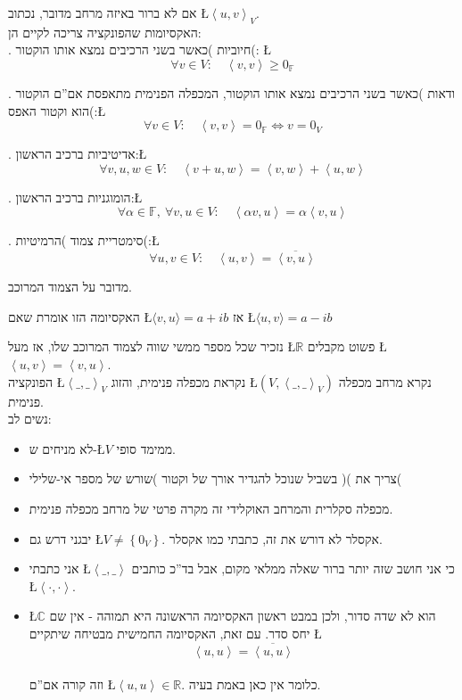 \documentclass[english,hebrew]{article}
\begin{document}
אם לא ברור באיזה מרחב מדובר, נכתוב \L{$\left\langle u,v\right\rangle _{V}$}.\\

האקסיומות שהפונקציה צריכה לקיים הן:\\

{\endL}. חיוביות )כאשר בשני הרכיבים נמצא אותו הוקטור(: \L{%
\[
\forall v\in V:\quad\left\langle v,v\right\rangle \geq0_{\mathbb{F}}
\]
}%

{\endL}. ודאות )כאשר בשני הרכיבים נמצא אותו הוקטור, המכפלה
הפנימית מתאפסת אם\textquotedblright ם הוקטור הוא וקטור האפס(:\L{%
\[
\forall v\in V:\quad\left\langle v,v\right\rangle =0_{\mathbb{F}}\iff v=0_{V}
\]
}%

{\endL}. אדיטיביות ברכיב הראשון:\L{%
\[
\forall v,u,w\in V:\quad\left\langle v+u,w\right\rangle =\left\langle v,w\right\rangle +\left\langle u,w\right\rangle 
\]
}%

{\endL}. הומוגניות ברכיב הראשון:\L{%
\[
\forall\alpha\in\mathbb{F},\ \forall v,u\in V:\quad\left\langle \alpha v,u\right\rangle =\alpha\left\langle v,u\right\rangle 
\]
}%

{\endL}. סימטריית צמוד )הרמיטיות(:\L{%
\[
\forall u,v\in V:\quad\left\langle u,v\right\rangle =\overline{\left\langle v,u\right\rangle }
\]
}%

מדובר על הצמוד המרוכב.

האקסיומה הזו אומרת שאם \L{$\langle v,u\rangle=a+ib$} אז \L{$\langle u,v\rangle=a-ib$}

נזכיר שכל מספר ממשי שווה לצמוד המרוכב שלו, אז מעל \L{$\mathbb{R}$}
פשוט מקבלים \L{$\left\langle u,v\right\rangle =\left\langle v,u\right\rangle $}.\\

הפונקציה \L{$\left\langle \_,\_\right\rangle _{V}$} נקראת מכפלה פנימית,
והזוג \L{$(V,\left\langle \_,\_\right\rangle _{V})$} נקרא מרחב מכפלה
פנימית.\\

נשים לב:
\begin{itemize}
\item לא מניחים ש-\L{$V$} ממימד סופי.
\item צריך את ){\endL}( בשביל שנוכל להגדיר אורך של וקטור )שורש
של מספר אי-שלילי(
\item מכפלה סקלרית והמרחב האוקלידי זה מקרה פרטי של מרחב מכפלה פנימית.
\item יבגני דרש גם \L{$V\ne\left\{ 0_{V}\right\} $}. אקסלר לא דורש את זה,
כתבתי כמו אקסלר.
\item אני כתבתי \L{$\left\langle \_,\_\right\rangle $} כי אני חושב שזה
יותר ברור שאלה ממלאי מקום, אבל בד\textquotedblright כ כותבים \L{$\left\langle \cdot,\cdot\right\rangle $}.
\item \L{$\mathbb{C}$} הוא לא שדה סדור, ולכן במבט ראשון האקסיומה הראשונה
היא תמוהה - אין שם יחס סדר. עם זאת, האקסיומה החמישית מבטיחה שיתקיים
\L{%
\[
\left\langle u,u\right\rangle =\overline{\left\langle u,u\right\rangle }
\]
}%
\\
וזה קורה אם\textquotedblright ם \L{$\left\langle u,u\right\rangle \in\mathbb{R}$}.
כלומר אין כאן באמת בעיה.
\end{itemize}
\end{document}
